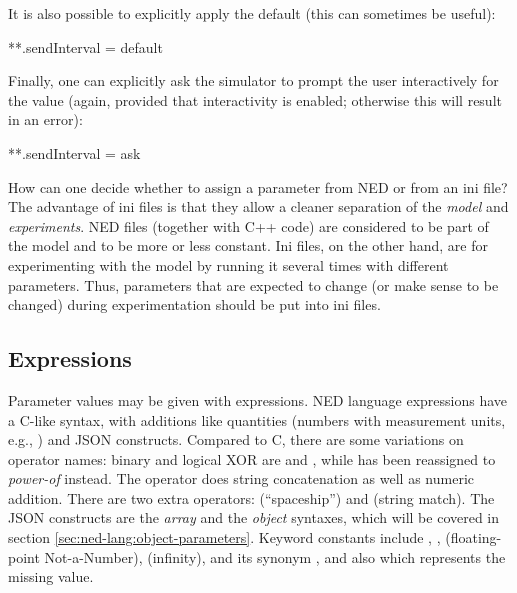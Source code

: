 It is also possible to explicitly apply the default (this can sometimes be useful):

\begin{inifile}
**.sendInterval = default
\end{inifile}

Finally, one can explicitly ask the simulator to prompt the user interactively
for the value (again, provided that interactivity is enabled; otherwise this
will result in an error):

\begin{inifile}
**.sendInterval = ask
\end{inifile}

\begin{note}
    How can one decide whether to assign a parameter from NED or from an ini
    file? The advantage of ini files is that they allow a cleaner separation of
    the \textit{model} and \textit{experiments}. NED files (together with C++
    code) are considered to be part of the model and to be more or less
    constant. Ini files, on the other hand, are for experimenting with the model
    by running it several times with different parameters. Thus, parameters that
    are expected to change (or make sense to be changed) during experimentation
    should be put into ini files.
\end{note}


\subsection{Expressions}
\label{sec:ned-lang:expressions}

Parameter values may be given with expressions. NED language expressions have a
C-like syntax, with additions like quantities (numbers with measurement units,
e.g., ) and JSON constructs. Compared to C, there are some
variations on operator names: binary and logical XOR are \ttt{\#} and
\ttt{\#\#}, while \ttt{\^} has been reassigned to \textit{power-of} instead. The
\ttt{+} operator does string concatenation as well as numeric addition. There
are two extra operators: \ttt{<=>} (``spaceship'') and \ttt{=\ensuremath{\sim}}
(string match). The JSON constructs are the \textit{array} and the
\textit{object} syntaxes, which will be covered in section
\ref{sec:ned-lang:object-parameters}. Keyword constants include ,
,  (floating-point Not-a-Number), 
(infinity),  and its synonym , and also
 which represents the missing value.

